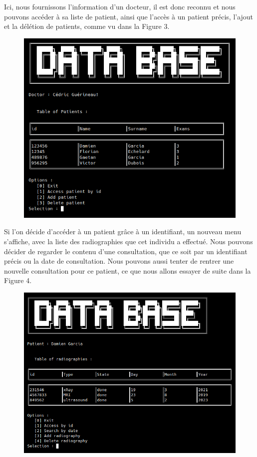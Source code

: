 \documentclass[12pt,a4paper]{article}
\begin{document}
\begin{multicols}{2}
		Ici, nous fournissons l'information d'un docteur, il est donc reconnu et nous pouvons accéder à sa liste de patient, ainsi que l'accès à un patient précis, l'ajout et la délétion de patients, comme vu dans la Figure 3.
					

		\begin{figure}
			\centering
			\includegraphics[width=\linewidth]{images/walkthrough/doctor_main.png}
			\label{fig:menu_docteur}
		\end{figure}
				
		Si l'on décide d'accéder à un patient grâce à un identifiant, un nouveau menu s'affiche, avec la liste des radiographies que cet individu a effectué. Nous pouvons décider de regarder le contenu d'une consultation, que ce soit par un identifiant précis ou la date de consultation. Nous pouvons aussi tenter de rentrer une nouvelle consultation pour ce patient, ce que nous allons essayer de suite dans la Figure 4.
				
		\begin{figure}
			\centering
			\includegraphics[width=\linewidth]{images/walkthrough/doctor_patient_main.png}
			\label{fig:menu_patient}
		\end{figure}

	\end{multicols}
	
\end{document}
